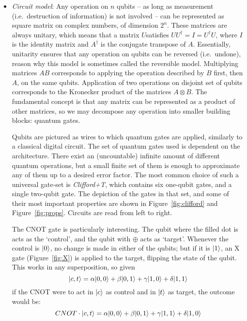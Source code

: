\begin{itemize}

\item \textit{Circuit model}: Any operation on \(n\) qubits -- as long as measurement (i.e.\ destruction of information) is not involved -- can be represented as square matrix on complex numbers, of dimension \(2^n\). These matrices are always unitary, which means that a matrix \(U\)satisfies \(UU^\dag = I = U^\dag U\), where \(I\) is the identity matrix and \(A^\dag\) is the conjugate transpose of \(A\). Essentially, unitarity ensures that any operation on qubits can be reversed (i.e.\ undone), reason why this model is sometimes called the reversible model. Multiplying matrices \(AB\) corresponds to applying the operation described by \(B\) first, then \(A\), on the same qubits. Application of two operations on disjoint set of qubits corresponds to the Kronecker product of the matrices \(A \otimes B\). The fundamental concept is that any matrix can be represented as a product of other matrices, so we may decompose any operation into smaller building blocks: quantum gates.

Qubits are pictured as wires to which quantum gates are applied, similarly to a classical digital circuit. The set of quantum gates used is dependent on the architecture. There exist an (uncountable) infinite amount of different quantum operations, but a small finite set of them is enough to approximate any of them up to a desired error factor. The most common choice of such a universal gate-set is \textit{Clifford+T}, which contains six one-qubit gates, and a single two-qubit gate. The depiction of the gates in that set, and some of their most important properties are shown in Figure~\ref{fig:clifford} and Figure~\ref{fig:props}. Circuits are read from left to right.






The CNOT gate is particularly interesting. The qubit where the filled dot is acts as the `control', and the qubit with \(\oplus\) acts as `target'. Whenever the control is \(\vert 0 \rangle\), no change is made in either of the qubits; but if it is \(\vert 1 \rangle\), an X gate (Figure~\ref{fig:X}) is applied to the target, flipping the state of the qubit. This works in any superposition, so given \[\vert c,t \rangle = \alpha\vert 0,0 \rangle + \beta\vert 0,1 \rangle + \gamma\vert 1,0 \rangle + \delta\vert 1,1 \rangle\] if the CNOT were to act in \(\vert c \rangle\) as control and in \(\vert t \rangle\) as target, the outcome would be: \[CNOT \cdot \vert c,t \rangle = \alpha\vert 0,0 \rangle + \beta\vert 0,1 \rangle + \gamma\vert 1,1 \rangle + \delta\vert 1,0 \rangle\]


\end{itemize}
